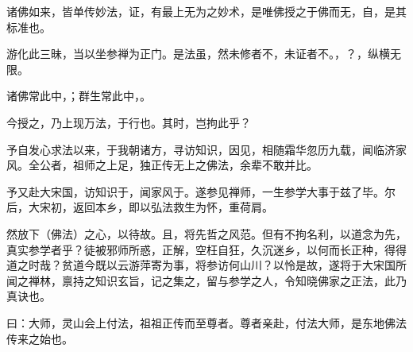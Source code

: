 




诸佛如来，皆单传妙法，证，有最上无为之妙术，是唯佛授之于佛而无，自，是其标准也。

游化此三昧，当以坐参禅为正门。是法虽，然未修者不，未证者不。，？，纵横无限。

诸佛常此中，；群生常此中，。

今授之，乃上现万法，于行也。其时，岂拘此乎？

予自发心求法以来，于我朝诸方，寻访知识，因见，相随霜华忽历九载，闻临济家风。全公者，祖师之上足，独正传无上之佛法，余辈不敢并比。

予又赴大宋国，访知识于，闻家风于。遂参见禅师，一生参学大事于兹了毕。尔后，大宋初，返回本乡，即以弘法救生为怀，重荷肩。

然放下（佛法）之心，以待故。且，将先哲之风范。但有不拘名利，以道念为先，真实参学者乎？徒被邪师所惑，正解，空枉自狂，久沉迷乡，以何而长正种，得得道之时哉？贫道今既以云游萍寄为事，将参访何山川？以怜是故，遂将于大宋国所闻之禅林，禀持之知识玄旨，记之集之，留与参学之人，令知晓佛家之正法，此乃真诀也。

曰：大师，灵山会上付法，祖祖正传而至尊者。尊者亲赴，付法大师，是东地佛法传来之始也。

